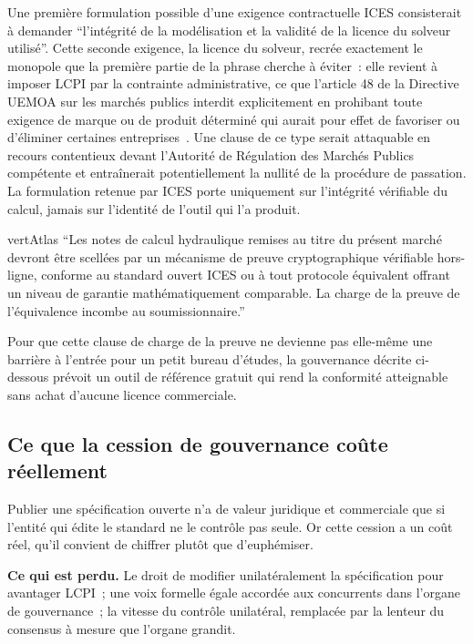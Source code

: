 \documentclass[11pt,a4paper]{article}
\begin{document}
Une première formulation possible d'une exigence contractuelle ICES consisterait à demander \enquote{l'intégrité de la modélisation et la validité de la licence du solveur utilisé}. Cette seconde exigence, la licence du solveur, recrée exactement le monopole que la première partie de la phrase cherche à éviter~: elle revient à imposer LCPI par la contrainte administrative, ce que l'article 48 de la Directive UEMOA sur les marchés publics interdit explicitement en prohibant toute exigence de marque ou de produit déterminé qui aurait pour effet de favoriser ou d'éliminer certaines entreprises~\cite{uemoa2005}. Une clause de ce type serait attaquable en recours contentieux devant l'Autorité de Régulation des Marchés Publics compétente et entraînerait potentiellement la nullité de la procédure de passation. La formulation retenue par ICES porte uniquement sur l'intégrité vérifiable du calcul, jamais sur l'identité de l'outil qui l'a produit.

\begin{icesbox}{vertAtlas}
\enquote{Les notes de calcul hydraulique remises au titre du présent marché devront être scellées par un mécanisme de preuve cryptographique vérifiable hors-ligne, conforme au standard ouvert ICES ou à tout protocole équivalent offrant un niveau de garantie mathématiquement comparable. La charge de la preuve de l'équivalence incombe au soumissionnaire.}
\end{icesbox}

Pour que cette clause de charge de la preuve ne devienne pas elle-même une barrière à l'entrée pour un petit bureau d'études, la gouvernance décrite ci-dessous prévoit un outil de référence gratuit qui rend la conformité atteignable sans achat d'aucune licence commerciale.

\subsection{Ce que la cession de gouvernance coûte réellement}

Publier une spécification ouverte n'a de valeur juridique et commerciale que si l'entité qui édite le standard ne le contrôle pas seule. Or cette cession a un coût réel, qu'il convient de chiffrer plutôt que d'euphémiser.

\textbf{Ce qui est perdu.} Le droit de modifier unilatéralement la spécification pour avantager LCPI~; une voix formelle égale accordée aux concurrents dans l'organe de gouvernance~; la vitesse du contrôle unilatéral, remplacée par la lenteur du consensus à mesure que l'organe grandit.
\end{document}
